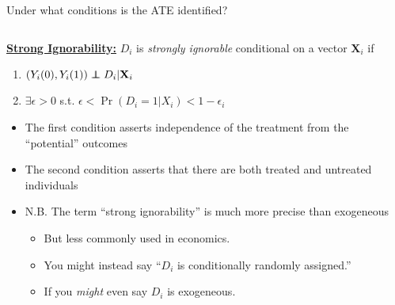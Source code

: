 \documentclass[notes,11pt, aspectratio=169]{beamer}
\newcommand\independent{\protect\mathpalette{\protect\independenT}{\perp}}
\def\independenT#1#2{\mathrel{\rlap{$#1#2$}\mkern2mu{#1#2}}}
\begin{document}
\begin{frame}{Under what conditions is the ATE identified?}
\begin{columns}[T] %
  \hspace{5pt} \begin{column}{.8\textwidth} \underline{\textbf{Strong
        Ignorability:}} $D_{i}$ is \emph{strongly ignorable} conditional on a vector  $\mathbf{X}_{i}$ if
    \begin{enumerate}
    \item $(Y_{i}(0), Y_{i}(1)) \independent D_{i} | \mathbf{X}_{i} $
    \item $\exists \epsilon > 0$ s.t. $\epsilon < \Pr(D_{i} = 1 | X_{i}) < 1-\epsilon_{i}$
    \end{enumerate}

    \begin{itemize}
    \item    The first condition asserts independence of the treatment from the ``potential'' outcomes
    \item The second condition asserts that there are both treated and untreated individuals
    \end{itemize}

    \begin{itemize}
    \item N.B. The term ``strong ignorability'' is much more precise than exogeneous
      \begin{itemize}
      \item But less commonly used in economics.
      \item You might instead say ``$D_{i}$ is conditionally randomly assigned.''
      \item If you \emph{might} even say $D_{i}$ is exogeneous.
      \end{itemize}
    \end{itemize}
      
\end{column}%
\hfill%
\begin{column}{.38\textwidth}
\end{column}%
\end{columns}
\end{frame}
\end{document}
